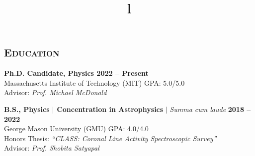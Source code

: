 \documentclass[marg, centered]{res}
\begin{document}
\begin{resume}



\section{{\scshape \bfseries Education}}
{\bf Ph.D. Candidate, Physics \hfill 2022 -- Present}\\
{Massachusetts Institute of Technology (MIT)} \hfill GPA: 5.0/5.0 \\
Advisor: {\em Prof. Michael McDonald} \\
\vspace{-0.7cm}

{\bf B.S., Physics $|$ Concentration in Astrophysics} $|$ {\em Summa cum laude} \hfill {\bf 2018 -- 2022} \\
{George Mason University (GMU)} \hfill GPA: 4.0/4.0 \\ 
Honors Thesis: {\em ``CLASS: Coronal Line Activity Spectroscopic Survey''} \\
Advisor: {\em Prof. Shobita Satyapal}


\begin{format}
\title{l}\\
\body
\end{format}


\end{resume}
\end{document}
